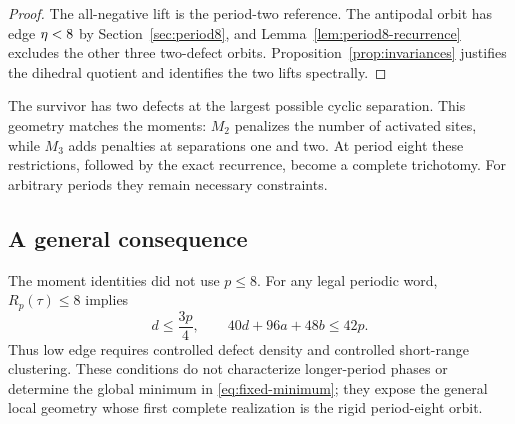 \begin{proof}
The all-negative lift is the period-two reference.  The antipodal orbit has
edge $\eta<8$ by Section~\ref{sec:period8}, and
Lemma~\ref{lem:period8-recurrence} excludes the other three two-defect orbits.
Proposition~\ref{prop:invariances} justifies the dihedral quotient and
identifies the two lifts spectrally.
\end{proof}

The survivor has two defects at the largest possible cyclic separation.
This geometry matches the moments: $M_2$ penalizes the number of activated
sites, while $M_3$ adds penalties at separations one and two.  At period eight
these restrictions, followed by the exact recurrence, become a complete
trichotomy.  For arbitrary periods they remain necessary constraints.

\subsection{A general consequence}

The moment identities did not use $p\leq8$.  For any legal periodic word,
$R_p(\tau)\leq8$ implies
\begin{equation}
 d\leq\frac{3p}{4},\qquad 40d+96a+48b\leq42p.
 \label{eq:general-defect-bounds}
\end{equation}
Thus low edge requires controlled defect density and controlled short-range
clustering.  These conditions do not characterize longer-period phases or
determine the global minimum in \eqref{eq:fixed-minimum}; they expose the
general local geometry whose first complete realization is the rigid
period-eight orbit.
